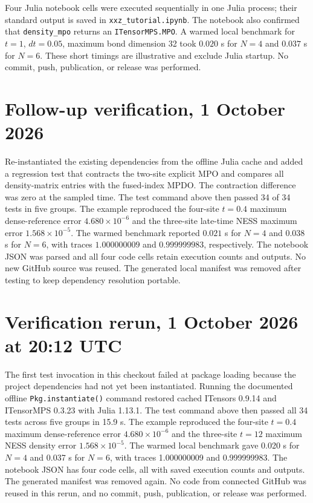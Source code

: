 \documentclass[11pt]{article}
\begin{document}
Four Julia notebook cells were executed sequentially in one Julia process;
their standard output is saved in \texttt{xxz\_tutorial.ipynb}. The notebook
also confirmed that \texttt{density\_mpo} returns an
\texttt{ITensorMPS.MPO}. A warmed local benchmark for $t=1$, $dt=0.05$,
maximum bond dimension 32 took $0.020$ s for $N=4$ and $0.037$ s
for $N=6$. These short timings are illustrative and exclude Julia startup.
No commit, push, publication, or release was performed.
\section*{Follow-up verification, 1 October 2026}
Re-instantiated the existing dependencies from the offline Julia cache and
added a regression test that contracts the two-site explicit MPO and
compares all density-matrix entries with the fused-index MPDO. The
contraction difference was zero at the sampled time. The test command
above then passed 34 of 34 tests in five groups. The example reproduced
the four-site $t=0.4$ maximum dense-reference error $4.680\times10^{-6}$
and the three-site late-time NESS maximum error $1.568\times10^{-5}$.
The warmed benchmark reported $0.021$ s for $N=4$ and $0.038$ s for
$N=6$, with traces $1.000000009$ and $0.999999983$, respectively.
The notebook JSON was parsed and all four code cells retain execution
counts and outputs. No new GitHub source was reused. The generated local
manifest was removed after testing to keep dependency resolution portable.
\section*{Verification rerun, 1 October 2026 at 20:12 UTC}
The first test invocation in this checkout failed at package loading because
the project dependencies had not yet been instantiated. Running the documented
offline \texttt{Pkg.instantiate()} command restored cached ITensors 0.9.14
and ITensorMPS 0.3.23 with Julia 1.13.1. The test command above then passed
all 34 tests across five groups in 15.9 s. The example reproduced the
four-site $t=0.4$ maximum dense-reference error $4.680\times10^{-6}$
and the three-site $t=12$ maximum NESS density error
$1.568\times10^{-5}$. The warmed local benchmark gave 0.020 s for
$N=4$ and 0.037 s for $N=6$, with traces 1.000000009 and
0.999999983. The notebook JSON has four code cells, all with saved
execution counts and outputs. The generated manifest was removed again.
No code from connected GitHub was reused in this rerun, and no commit,
push, publication, or release was performed.
\end{document}
